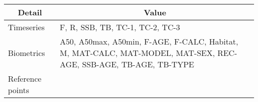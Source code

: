 \begin{table}[htb]
\centering
\begin{tabular}{lp{7cm}}
\toprule
\multicolumn{1}{c}{\textbf{Detail}} & \multicolumn{1}{c}{\textbf{Value}} \\
\midrule
Timeseries       & F, R, SSB, TB, TC-1, TC-2, TC-3                                                                                 \\
Biometrics       & A50, A50max, A50min, F-AGE, F-CALC, Habitat, M, MAT-CALC, MAT-MODEL, MAT-SEX, REC-AGE, SSB-AGE, TB-AGE, TB-TYPE \\
Reference points &                                                                                                                 \\
\bottomrule
\end{tabular}
\label{tab:timebiodet}
\end{table}
